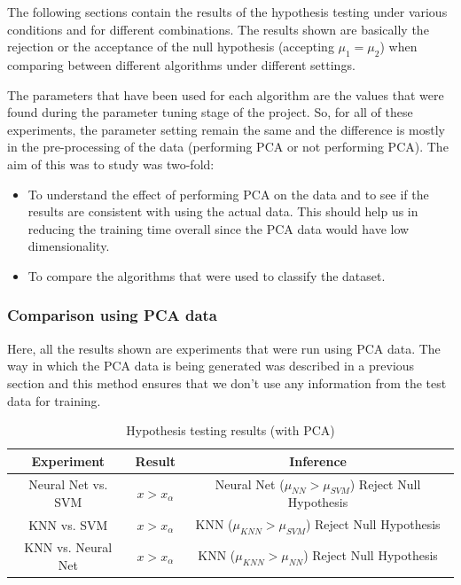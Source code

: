 \documentclass[10pt]{scrartcl}
\begin{document}
The following sections contain the results of the hypothesis testing under various conditions and for different combinations. The results shown are basically the rejection or the acceptance of the null hypothesis (accepting $\mu_{1} = \mu_{2}$) when comparing between different algorithms under different settings.

The parameters that have been used for each algorithm are the values that were found during the parameter tuning stage of the project. So, for all of these experiments, the parameter setting remain the same and the difference is mostly in the pre-processing of the data (performing PCA or not performing PCA). The aim of this was to study was two-fold:

\begin{itemize}
\item To understand the effect of performing PCA on the data and to see if the results are consistent with using the actual data. This should help us in reducing the training time overall since the PCA data would have low dimensionality. 

\item To compare the algorithms that were used to classify the dataset.
\end{itemize}


\subsubsection*{Comparison using PCA data}

Here, all the results shown are experiments that were run using PCA data. The way in which the PCA data is being generated was described in a previous section and this method ensures that we don't use any information from the test data for training.

\begin{table}[H]
\centering
\begin{tabular}{ c|c|c } 
 \textbf{Experiment} & \textbf{Result} & \textbf{Inference} \\ 
 \hline
Neural Net vs. SVM & $x > x_{\alpha}$ & Neural Net ($\mu_{NN} > \mu_{SVM}$) Reject Null Hypothesis\\ 
KNN vs. SVM & $x > x_{\alpha}$ &  KNN ($\mu_{KNN} > \mu_{SVM}$) Reject Null Hypothesis\\ 
KNN vs. Neural Net & $x > x_{\alpha}$ &  KNN ($\mu_{KNN} > \mu_{NN}$) Reject Null Hypothesis \\
\end{tabular}
\caption{Hypothesis testing results (with PCA) \label{tab:hypo_test_pca}}
\end{table}
\end{document}
